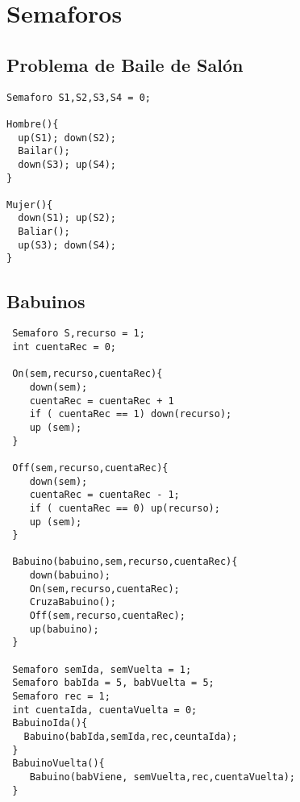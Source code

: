 \documentclass{article}
\author{\nombre , \carnet}
\title{\titulo}
\begin{document}
\maketitle

\section{Semaforos}

\subsection{Problema de Baile de Salón}
\begin{lstlisting}
Semaforo S1,S2,S3,S4 = 0;

Hombre(){
  up(S1); down(S2);
  Bailar();
  down(S3); up(S4);
}

Mujer(){
  down(S1); up(S2);
  Baliar();
  up(S3); down(S4);
}

\end{lstlisting} 

\subsection{Babuinos}
\begin{lstlisting}
 Semaforo S,recurso = 1;
 int cuentaRec = 0;
 
 On(sem,recurso,cuentaRec){
    down(sem);
    cuentaRec = cuentaRec + 1
    if ( cuentaRec == 1) down(recurso);
    up (sem);
 }

 Off(sem,recurso,cuentaRec){
    down(sem);
    cuentaRec = cuentaRec - 1;
    if ( cuentaRec == 0) up(recurso);
    up (sem);
 }

 Babuino(babuino,sem,recurso,cuentaRec){
    down(babuino);
    On(sem,recurso,cuentaRec);
    CruzaBabuino();
    Off(sem,recurso,cuentaRec);
    up(babuino);
 }

 Semaforo semIda, semVuelta = 1;
 Semaforo babIda = 5, babVuelta = 5;
 Semaforo rec = 1;
 int cuentaIda, cuentaVuelta = 0;
 BabuinoIda(){
   Babuino(babIda,semIda,rec,ceuntaIda);
 }
 BabuinoVuelta(){
    Babuino(babViene, semVuelta,rec,cuentaVuelta);
 }

\end{lstlisting} 
\end{document}
